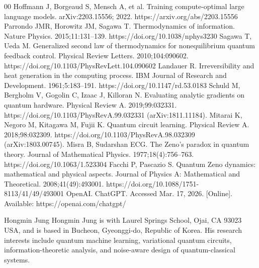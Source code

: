 \documentclass[]{ieeeaccess}
\newcounter{biography}
\begin{document}
\begin{thebibliography}{00}
 Hoffmann J, Borgeaud S, Mensch A, et al. Training compute-optimal large language models. arXiv:2203.15556; 2022. https://arxiv.org/abs/2203.15556
 Parrondo JMR, Horowitz JM, Sagawa T. Thermodynamics of information. Nature Physics. 2015;11:131--139. https://doi.org/10.1038/nphys3230
 Sagawa T, Ueda M. Generalized second law of thermodynamics for nonequilibrium quantum feedback control. Physical Review Letters. 2010;104:090602. https://doi.org/10.1103/PhysRevLett.104.090602
 Landauer R. Irreversibility and heat generation in the computing process. IBM Journal of Research and Development. 1961;5:183--191. https://doi.org/10.1147/rd.53.0183
 Schuld M, Bergholm V, Gogolin C, Izaac J, Killoran N. Evaluating analytic gradients on quantum hardware. Physical Review A. 2019;99:032331. https://doi.org/10.1103/PhysRevA.99.032331 (arXiv:1811.11184).
 Mitarai K, Negoro M, Kitagawa M, Fujii K. Quantum circuit learning. Physical Review A. 2018;98:032309. https://doi.org/10.1103/PhysRevA.98.032309 (arXiv:1803.00745).
 Misra B, Sudarshan ECG. The Zeno’s paradox in quantum theory. Journal of Mathematical Physics. 1977;18(4):756--763. https://doi.org/10.1063/1.523304
 Facchi P, Pascazio S. Quantum Zeno dynamics: mathematical and physical aspects. Journal of Physics A: Mathematical and Theoretical. 2008;41(49):493001. https://doi.org/10.1088/1751-8113/41/49/493001
 OpenAI. ChatGPT. Accessed Mar. 17, 2026. [Online]. Available: https://openai.com/chatgpt/
\end{thebibliography}

\begin{IEEEbiographynophoto}{Hongmin Jung}
Hongmin Jung is with Laurel Springs School, Ojai, CA 93023 USA, and is based in Bucheon, Gyeonggi-do, Republic of Korea. His research interests include quantum machine learning, variational quantum circuits, information-theoretic analysis, and noise-aware design of quantum-classical systems.
\end{IEEEbiographynophoto}

\EOD
\end{document}
